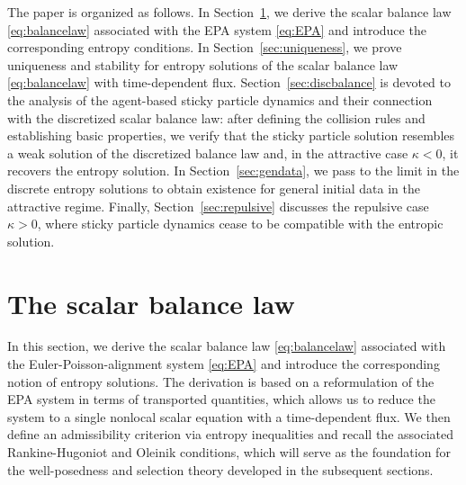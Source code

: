 \documentclass[10pt,a4paper]{amsart}
\begin{document}
	
	The paper is organized as follows. 
	In Section~\ref{sec:balancelaw}, we derive the scalar balance law \eqref{eq:balancelaw} associated with the EPA system \eqref{eq:EPA} and introduce the corresponding entropy conditions. 
	In Section~\ref{sec:uniqueness}, we prove uniqueness and stability for entropy solutions of the scalar balance law \eqref{eq:balancelaw} with time-dependent flux.
	Section~\ref{sec:discbalance} is devoted to the analysis of the  agent-based sticky particle dynamics and their connection with the discretized scalar balance law: after defining the collision rules and establishing basic properties, we verify that the sticky particle solution resembles a weak solution of the discretized balance law and, in the attractive case $\kappa<0$, it recovers the entropy solution.
	In Section~\ref{sec:gendata}, we pass to the limit in the discrete entropy solutions to obtain existence for general initial data in the attractive regime. Finally, Section~\ref{sec:repulsive} discusses the repulsive case $\kappa>0$, where sticky particle dynamics cease to be compatible with the entropic solution.
	
	
	\section{The scalar balance law}\label{sec:balancelaw}
	In this section, we derive the scalar balance law \eqref{eq:balancelaw} associated with the Euler-Poisson-alignment system \eqref{eq:EPA} and introduce the corresponding notion of entropy solutions. The derivation is based on a reformulation of the EPA system in terms of transported quantities, which allows us to reduce the system to a single nonlocal scalar equation with a time-dependent flux. We then define an admissibility criterion via entropy inequalities and recall the associated Rankine-Hugoniot and Oleinik conditions, which will serve as the foundation for the well-posedness and selection theory developed in the subsequent sections.
	
\end{document}

